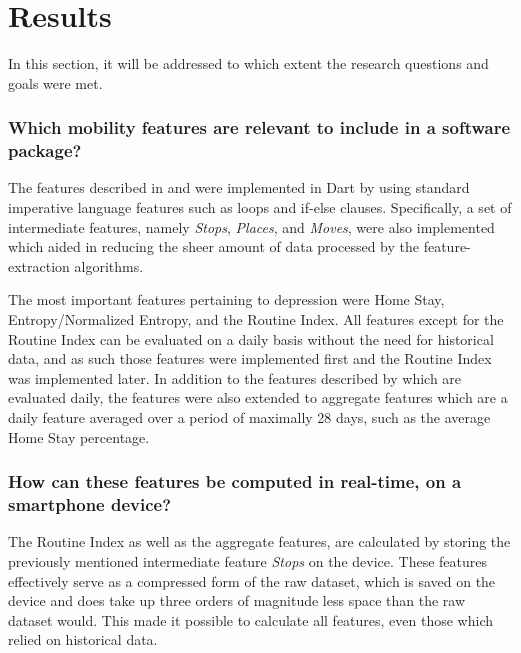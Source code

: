 \section{Results}

In this section, it will be addressed to which extent the research questions and goals were met.
    
\subsubsection*{Which mobility features are relevant to include in a software package?}
The features described in \cite{Saeb2015} and \cite{extraction-of-behavioural-features} were implemented in Dart by using standard imperative language features such as loops and if-else clauses. Specifically, a set of intermediate features, namely\textit{ Stops}, \textit{Places}, and \textit{Moves}, were also implemented which aided in reducing the sheer amount of data processed by the feature-extraction algorithms. 

The most important features pertaining to depression were Home Stay, Entropy/Normalized Entropy, and the Routine Index. All features except for the Routine Index can be evaluated on a daily basis without the need for historical data, and as such those features were implemented first and the Routine Index was implemented later. In addition to the features described by \cite{Saeb2015} which are evaluated daily, the features were also extended to aggregate features which are a daily feature averaged over a period of maximally 28 days, such as the average Home Stay percentage.

\subsubsection*{How can these features be computed in real-time, on a smartphone device?}
The Routine Index as well as the aggregate features, are calculated by storing the previously mentioned intermediate feature \textit{Stops} on the device. These features effectively serve as a compressed form of the raw dataset, which is saved on the device and does take up three orders of magnitude less space than the raw dataset would. This made it possible to calculate all features, even those which relied on historical data.

